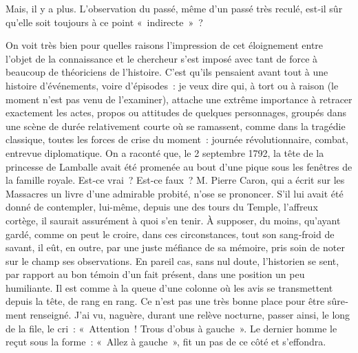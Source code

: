 \documentclass[french,twoside]{book} %
\newcommand{\astermono}{\medskip\centerline{\color{rubric}\large\selectfont{\syms ✻}}\medskip\par}%
\begin{document}
\astermono

\noindent Mais, il y a plus. L’observation du passé, même d’un passé très reculé, est‑il sûr qu’elle soit toujours à ce point « indirecte » ?\par
On voit très bien pour quelles raisons l’impression de cet éloignement entre l’objet de la connaissance et le chercheur s’est imposé avec tant de force à beaucoup de théoriciens de l’histoire. C’est qu’ils pensaient avant tout à une histoire d’événements, voire d’épisodes : je veux dire qui, à tort ou à raison (le moment n’est pas venu de l’examiner), attache une  
\label{p19} extrême importance à retracer exactement les actes, propos ou attitudes de quelques personnages, groupés dans une scène de durée relativement courte où se ramassent, comme dans la tragédie classique, toutes les forces de crise du moment : journée révolutionnaire, combat, entrevue diplo­matique. On a raconté que, le 2 septembre 1792, la tête de la princesse de Lamballe avait été promenée au bout d’une pique sous les fenêtres de la famille royale. Est‑ce vrai ? Est‑ce faux ? M. Pierre Caron, qui a écrit sur les Massacres un livre d’une admirable probité, n’ose se prononcer. S’il lui avait été donné de contempler, lui-même, depuis une des tours du Temple, l’affreux cortège, il saurait assurément à quoi s’en tenir. À supposer, du moins, qu’ayant gardé, comme on peut le croire, dans ces circonstances, tout son sang‑froid de savant, il eût, en outre, par une juste méfiance de sa mémoire, pris soin de noter sur le champ ses obser­vations. En pareil cas, sans nul doute, l’historien se sent, par rapport au bon témoin d’un fait présent, dans une position un peu humiliante. Il est comme à la queue d’une colonne où les avis se transmettent depuis la tête, de rang en rang. Ce n’est pas une très bonne place pour être sûre­ment renseigné. J’ai vu, naguère, durant une relève nocturne, passer ainsi, le long de la file, le cri : « Attention ! Trous d’obus à gauche ». Le dernier homme le reçut sous la forme : « Allez à gauche », fit un pas de ce côté et s’effondra.\par
\end{document}

